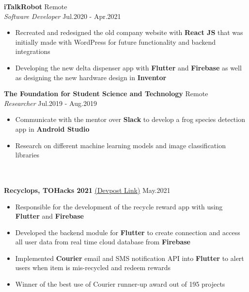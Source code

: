 \documentclass[a4paper]{article}
\newcommand{\lineunder} {
    \vspace*{-8pt} \\
    \hspace*{-18pt} \hrulefill \\
}
\newcommand{\header} [1] {
    {\hspace*{-18pt}\vspace*{6pt} \textsc{#1}}
    \vspace*{-6pt} \lineunder
}
\begin{document}
\vspace{-1mm}

\textbf{iTalkRobot} \hfill Remote\\
\textit{Software Developer} \hfill Jul.2020 - Apr.2021\\
\vspace{-2mm}
\begin{itemize} \itemsep -2pt
	\item{Recreated and redesigned the old company website with \textbf{React JS} that was initially made with WordPress for future functionality and backend integrations}
	\item{Developing the new delta dispenser app with \textbf{Flutter} and \textbf{Firebase} as well as designing the new hardware design in \textbf{Inventor}}
\end{itemize}

\vspace{-1mm}

\textbf{The Foundation for Student Science and Technology} \hfill Remote\\
\textit{Researcher} \hfill Jul.2019 - Aug.2019\\
\vspace{-2mm}
\begin{itemize} \itemsep -2pt
	\item{Communicate with the mentor over \textbf{Slack} to develop a frog species detection app in \textbf{Android Studio}}
	\item{Research on different machine learning models and image classification libraries}
\end{itemize}

\header{\textbf{}}
\vspace{1mm}
{\textbf{Recyclops, TOHacks 2021}} \href{https://devpost.com/software/recyclops-lxghf8}{(Devpost Link)}
\hfill{May.2021}\\

\vspace{-2mm}
 \begin{itemize} \itemsep -2pt
    \item{Responsible for the development of the recycle reward app with using \textbf{Flutter} and \textbf{Firebase}} 
    \item{Developed the backend module for \textbf{Flutter} to create connection and access all user data from real time cloud database from \textbf{Firebase}} 
    \item {Implemented \textbf{Courier} email and SMS notification API into \textbf{Flutter} to alert users when item is mis-recycled and redeem rewards}
    \item{Winner of the best use of Courier runner-up award out of 195 projects}
\end{itemize}
\end{document}
